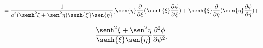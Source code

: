 \documentclass[12pt,a4paper]{article}
\begin{document}
\begin{enumerate}
\begin{enumerate}
        \begin{equation*}
            =\frac{1}{a^2 (\senh^2{\xi}+\sen^2{\eta})\senh{\xi}\sen{\eta}}[\sen{\eta}\frac{\partial}{\partial \xi} (\senh{\xi} \frac{\partial \phi}{\partial \xi}) + \senh{\xi}\frac{\partial}{\partial \eta}(\sen{\eta} \frac{\partial \phi}{\partial \eta})+ 
        \end{equation*}
        
        \begin{equation*}
            \frac{\senh^2{\xi}+\sen^2{\eta}}{\senh{\xi}\sen{\eta}} \frac{\partial^2 \phi}{\partial \psi^2}]
        \end{equation*}
        
        
    \end{enumerate}
\end{enumerate}
\end{document}
